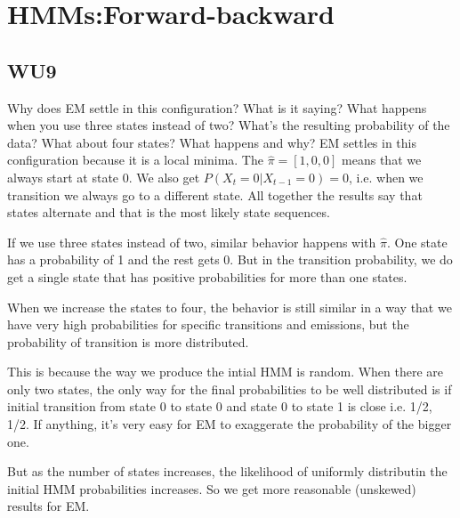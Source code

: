\documentclass[a4paper,11pt]{article}
\begin{document}
\section{HMMs:Forward-backward}
\subsection{WU9}
\textsf{Why does EM settle in this configuration? What is it saying? 
What happens when you use three states instead of two? 
What's the resulting probability of the data? 
What about four states? What happens and why?}\vspace{0.1in}
EM settles in this configuration because it is a local minima. The
$\hat \pi = [1,0,0]$ means that we always start at state 0. We also get $P(X_t=0|X_{t-1}=0)= 0$,
i.e. when we transition we always go to a different state. All
together the results say that states alternate and that is the most
likely state sequences.

If we use three states instead of two, similar behavior happens with
$\hat \pi$. One state has a probability of 1 and the rest gets 0. But
in the transition probability, we do get a single state that
has positive probabilities for more than one states.

When we increase the states to four, the behavior is still similar in
a way that we have very high probabilities for specific transitions
and emissions, but the probability of transition is more distributed.

This is because the way we produce the intial HMM is random. When
there are only two states, the only way for the final probabilities to
be well distributed is if initial transition from state 0 to state 0
and state 0 to state 1 is close i.e. 1/2, 1/2. If anything, it's very
easy for EM to exaggerate the probability of the bigger one.

But as the number of states increases, the likelihood of uniformly
distributin the initial HMM probabilities increases. So we get more
reasonable (unskewed) results for EM.
\end{document}
